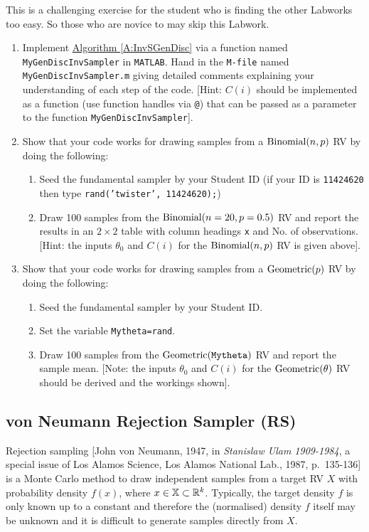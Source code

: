 \begin{labwork}This is a challenging exercise for the student who is finding the other Labworks too easy. So those who are novice to \Matlab may skip this Labwork.
\begin{enumerate}
\item Implement \hyperref[A:InvSGenDisc]{Algorithm \ref*{A:InvSGenDisc}} via a function named {\tt MyGenDiscInvSampler} in {\tt MATLAB}.  Hand in the {\tt M-file} named {\tt MyGenDiscInvSampler.m} giving detailed comments explaining your understanding of each step of the code.  [Hint: $C(i)$ should be implemented as a function (use function handles via {\tt @}) that can be passed as a parameter to the function {\tt MyGenDiscInvSampler}].
\item Show that your code works for drawing samples from a $\mbox{{\rm Binomial}}(n,p)$ RV by doing the following:
\begin{enumerate}
\item Seed the fundamental sampler by your Student ID (if your ID is {\tt 11424620} then type {\tt rand('twister', 11424620);})
\item Draw 100 samples from the $\mbox{{\rm Binomial}}(n=20,p=0.5)$ RV and report the results in an $2 \times 2$ table with column headings {\tt x} and {No. of observations}.  [Hint: the inputs $\theta_0$ and $C(i)$ for the $\mbox{{\rm Binomial}}(n,p)$ RV is given above].
\end{enumerate}
\item Show that your code works for drawing samples from a $\mbox{{\rm Geometric}}(p)$ RV by doing the following:
\begin{enumerate}
\item Seed the fundamental sampler by your Student ID.
\item Set the variable {\tt Mytheta=rand}.
\item Draw 100 samples from the $\mbox{{\rm Geometric}}({\tt Mytheta})$ RV and report the sample mean.  [Note: the inputs $\theta_0$ and $C(i)$ for the $\mbox{{\rm Geometric}}(\theta)$ RV should be derived and the workings shown].
\end{enumerate}
\end{enumerate}
\end{labwork}

\subsection{von Neumann Rejection Sampler (RS)}\label{S:RS}
Rejection sampling [John von Neumann, 1947, in {\it Stanislaw Ulam 1909-1984}, a special issue of Los Alamos Science, Los Alamos National Lab., 1987, p.~135-136] is a Monte Carlo method to draw independent
samples from a target RV $X$ with probability density $f(x)$, where $x \in \mathbb{X} \subset \mathbb{R}^k$.  Typically, the target density $f$ is only known up to a constant and therefore the (normalised) density $f$ itself may be unknown and it  is difficult to generate samples directly from $X$.

